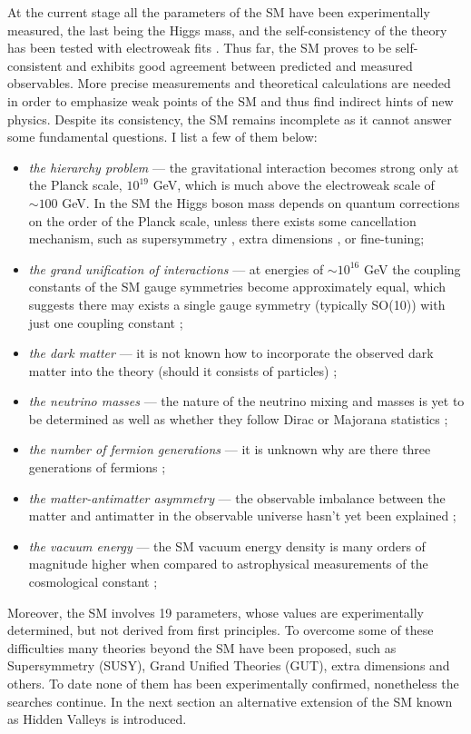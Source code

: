 At the current stage all the parameters of the SM have been experimentally measured,
the last being the Higgs mass, and the
self-consistency of the theory has been tested with electroweak fits \cite{Baak:2013ppa}.
Thus far, the SM proves to be self-consistent and exhibits good agreement between
predicted and measured observables. More precise measurements and theoretical calculations
are needed in order to emphasize weak points of the SM and thus
find indirect hints of new physics.
Despite its consistency, the SM remains incomplete as it cannot answer some fundamental 
questions. I list a few of them below:
\begin{itemize}
 \item {\it the hierarchy problem} --- the gravitational interaction becomes strong only at the 
Planck scale, $10^{19}$ GeV, which is much above the electroweak scale of $\sim 100$ GeV. 
In the SM the Higgs boson mass 
depends on quantum corrections on the order of the Planck scale, unless there
exists some cancellation mechanism, such as supersymmetry \cite{Martin:1997ns}, extra dimensions
\cite{ArkaniHamed:1998rs,Zee:2003mt}, or fine-tuning; 
 \item {\it the grand unification of interactions} --- at energies of $\sim 10^{16}$ GeV
the coupling constants of the SM gauge symmetries become approximately equal, which suggests
there may exists a single gauge symmetry (typically SO(10)) with just one coupling constant
\cite{Georgi:1974sy,Buras197866};
 \item {\it the dark matter} --- it is not known how to incorporate the observed
 dark matter into the theory (should it consists of particles) \cite{Bertone2005279};
 \item {\it the neutrino masses} --- the nature of the neutrino mixing and masses is yet to be
determined as well as whether they follow Dirac or Majorana statistics \cite{Fukuda:1998fd};
 \item {\it the number of fermion generations} --- it is unknown why are there three generations
of fermions \cite{Decamp:1989tu};
 \item {\it the matter-antimatter asymmetry} --- the observable imbalance between the matter and
antimatter in the observable universe hasn't yet been explained \cite{Fukugita:1986hr};
 \item {\it the vacuum energy} --- the SM vacuum
energy density is many orders of magnitude higher when compared to astrophysical measurements
of the cosmological constant \cite{Sahni:1999gb,Rugh2002663};
\end{itemize}
Moreover, the SM involves 19 parameters, whose values are experimentally determined, but not derived from
first principles.
To overcome some of these difficulties many theories beyond the SM have been
proposed, such as Supersymmetry (SUSY), Grand Unified Theories (GUT), extra dimensions and others.
To date none of them has been experimentally confirmed, nonetheless the searches continue.
In the next section an alternative extension of the SM known as Hidden Valleys 
is introduced. 

